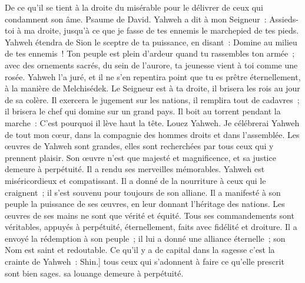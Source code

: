 \begin{multicols}{2}
De ce qu'il se tient à la droite du misérable pour le délivrer de ceux qui condamnent son âme.
\VerseOne{}Psaume de David. Yahweh a dit à mon Seigneur~: Assieds-toi à ma droite, jusqu'à ce que je fasse de tes ennemis le marchepied de tes pieds.
Yahweh étendra de Sion le sceptre de ta puissance, en disant~: Domine au milieu de tes ennemis~!
Ton peuple est plein d'ardeur quand tu rassembles ton armée~; avec des ornements sacrés, du sein de l'aurore, ta jeunesse vient à toi comme une rosée.
Yahweh l'a juré, et il ne s'en repentira point que tu es prêtre éternellement, à la manière de Melchisédek.
Le Seigneur est à ta droite, il brisera les rois au jour de sa colère.
Il exercera le jugement sur les nations, il remplira tout de cadavres~; il brisera le chef qui domine sur un grand pays.
Il boit au torrent pendant la marche~: C'est pourquoi il lève haut la tête.
\VerseOne{}Louez Yahweh.  Je célébrerai Yahweh de tout mon cœur,  dans la compagnie des hommes droits et dans l'assemblée.
 Les œuvres de Yahweh sont grandes,  elles sont recherchées par tous ceux qui y prennent plaisir.
 Son œuvre n'est que majesté et magnificence,  et sa justice demeure à perpétuité.
 Il a rendu ses merveilles mémorables.  Yahweh est miséricordieux et compatissant.
 Il a donné de la nourriture à ceux qui le craignent~;  il s'est souvenu pour toujours de son alliane.
 Il a manifesté à son peuple la puissance de ses œuvres,  en leur donnant l'héritage des nations.
 Les œuvres de ses mains ne sont que vérité et équité.  Tous ses commandements sont véritables,
 appuyés à perpétuité, éternellement,  faits avec fidélité et droiture.
 Il a envoyé la rédemption à son peuple~;  il lui a donné une alliance éternelle~;  son Nom est saint et redoutable.
 Ce qu'il y a de capital dans la sagesse c'est la crainte de Yahweh~: Shin.] tous ceux qui s'adonnent à faire ce qu'elle prescrit sont bien sages.  sa louange demeure à perpétuité.

\end{multicols}
